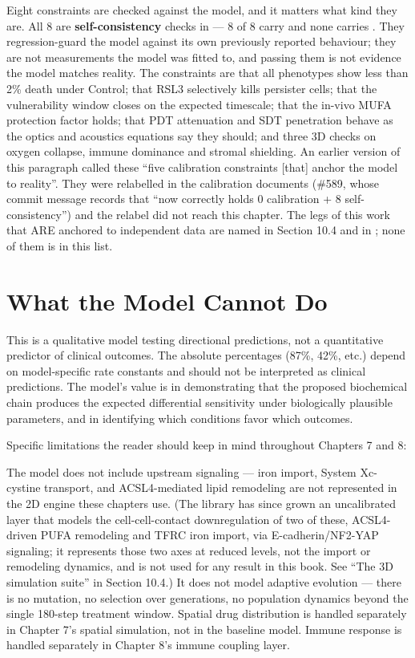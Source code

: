 \documentclass[11pt,twoside,openright]{report}
\begin{document}
Eight constraints are checked against the model, and it matters what kind they are. All 8 are \textbf{self-consistency} checks in  --- 8 of 8 carry  and none carries . They regression-guard the model against its own previously reported behaviour; they are not measurements the model was fitted to, and passing them is not evidence the model matches reality. The constraints are that all phenotypes show less than 2\% death under Control; that RSL3 selectively kills persister cells; that the vulnerability window closes on the expected timescale; that the in-vivo MUFA protection factor holds; that PDT attenuation and SDT penetration behave as the optics and acoustics equations say they should; and three 3D checks on oxygen collapse, immune dominance and stromal shielding. An earlier version of this paragraph called these ``five calibration constraints [that] anchor the model to reality''. They were relabelled in the calibration documents (\#589, whose commit message records that  ``now correctly holds 0 calibration + 8 self-consistency'') and the relabel did not reach this chapter. The legs of this work that ARE anchored to independent data are named in Section 10.4 and in ; none of them is in this list.

\section{What the Model Cannot Do}

This is a qualitative model testing directional predictions, not a quantitative predictor of clinical outcomes. The absolute percentages (87\%, 42\%, etc.) depend on model-specific rate constants and should not be interpreted as clinical predictions. The model's value is in demonstrating that the proposed biochemical chain produces the expected differential sensitivity under biologically plausible parameters, and in identifying which conditions favor which outcomes.

Specific limitations the reader should keep in mind throughout Chapters 7 and 8:

The model does not include upstream signaling --- iron import, System Xc- cystine transport, and ACSL4-mediated lipid remodeling are not represented in the 2D engine these chapters use. (The library has since grown an uncalibrated  layer that models the cell-cell-contact downregulation of two of these, ACSL4-driven PUFA remodeling and TFRC iron import, via E-cadherin/NF2-YAP signaling; it represents those two axes at reduced levels, not the import or remodeling dynamics, and is not used for any result in this book. See ``The 3D simulation suite'' in Section 10.4.) It does not model adaptive evolution --- there is no mutation, no selection over generations, no population dynamics beyond the single 180-step treatment window. Spatial drug distribution is handled separately in Chapter 7's spatial simulation, not in the baseline model. Immune response is handled separately in Chapter 8's immune coupling layer.
\end{document}
